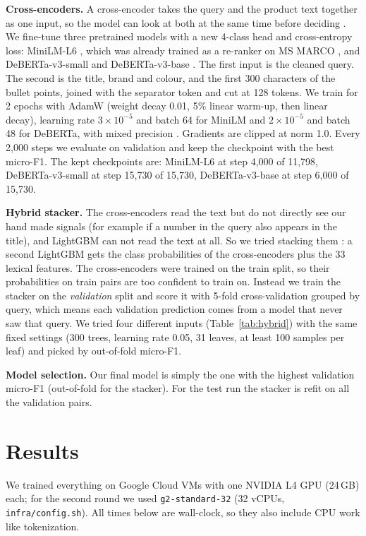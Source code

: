 \documentclass[11pt]{article}
\begin{document}
\textbf{Cross-encoders.} A cross-encoder takes the query and the product text together as one input, so the model can look at both at the same time before deciding \cite{nogueira2019}.
We fine-tune three pretrained models with a new 4-class head and cross-entropy loss: MiniLM-L6 \cite{wang2020}, which was already trained as a re-ranker on MS MARCO \cite{bajaj2016}, and DeBERTa-v3-small and DeBERTa-v3-base \cite{he2023}.
The first input is the cleaned query. The second is the title, brand and colour, and the first 300 characters of the bullet points, joined with the separator token and cut at 128 tokens.
We train for 2 epochs with AdamW \cite{loshchilov2019} (weight decay 0.01, 5\% linear warm-up, then linear decay), learning rate $3\times10^{-5}$ and batch 64 for MiniLM and $2\times10^{-5}$ and batch 48 for DeBERTa, with mixed precision \cite{wolf2020}.
Gradients are clipped at norm 1.0. Every 2,000 steps we evaluate on validation and keep the checkpoint with the best micro-F1. The kept checkpoints are: MiniLM-L6 at step 4{,}000 of 11{,}798, DeBERTa-v3-small at step 15{,}730 of 15{,}730, DeBERTa-v3-base at step 6{,}000 of 15{,}730.

\textbf{Hybrid stacker.} The cross-encoders read the text but do not directly see our hand made signals (for example if a number in the query also appears in the title), and LightGBM can not read the text at all. So we tried stacking them \cite{wolpert1992}: a second LightGBM gets the class probabilities of the cross-encoders plus the 33 lexical features.
The cross-encoders were trained on the train split, so their probabilities on train pairs are too confident to train on. Instead we train the stacker on the \emph{validation} split and score it with 5-fold cross-validation grouped by query, which means each validation prediction comes from a model that never saw that query.
We tried four different inputs (Table~\ref{tab:hybrid}) with the same fixed settings (300 trees, learning rate 0.05, 31 leaves, at least 100 samples per leaf) and picked by out-of-fold micro-F1.

\textbf{Model selection.} Our final model is simply the one with the highest validation micro-F1 (out-of-fold for the stacker). For the test run the stacker is refit on all the validation pairs.

\section{Results}
We trained everything on Google Cloud VMs with one NVIDIA L4 GPU (24\,GB) each; for the second round we used \texttt{g2-standard-32} (32 vCPUs, \texttt{infra/config.sh}).
All times below are wall-clock, so they also include CPU work like tokenization.
\end{document}
